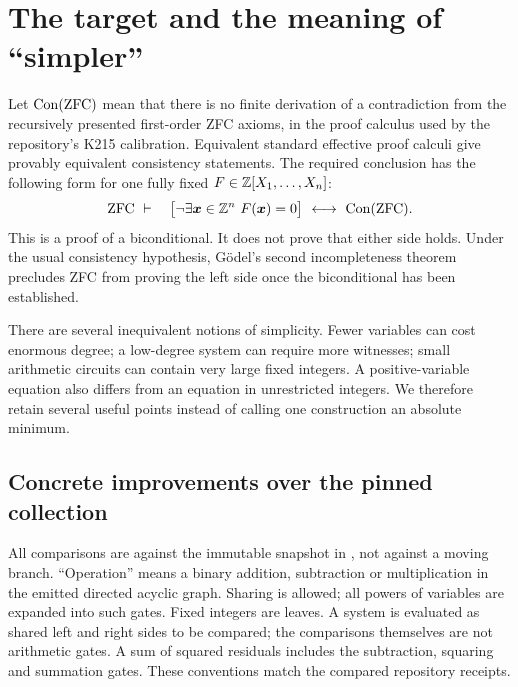 \section{The target and the meaning of ``simpler''}
\label{sec:overview}

Let $\operatorname{Con}(\mathrm{ZFC})$ mean that there is no finite derivation of a contradiction
from the recursively presented first-order ZFC axioms, in the proof
calculus used by the repository's K215 calibration.  Equivalent standard
effective proof calculi give provably equivalent consistency statements.
The required conclusion has the following form for one fully fixed
$F\in\mathbb Z[X_1,\ldots,X_n]$:
\begin{equation}\label{eq:target}
 \mathrm{ZFC}\ \vdash\quad
 \bigl[\neg\exists\boldsymbol{x}\in\mathbb Z^n\ F(\boldsymbol{x})=0\bigr]
 \ \longleftrightarrow\ \operatorname{Con}(\mathrm{ZFC}).
\end{equation}
This is a proof of a biconditional.  It does not prove that either side
holds.  Under the usual consistency hypothesis, G\"odel's second
incompleteness theorem precludes ZFC from proving the left side once
the biconditional has been established.

There are several inequivalent notions of simplicity.  Fewer variables
can cost enormous degree; a low-degree system can require more witnesses;
small arithmetic circuits can contain very large fixed integers.  A
positive-variable equation also differs from an equation in unrestricted
integers.  We therefore retain several useful points instead of calling
one construction an absolute minimum.

\subsection{Concrete improvements over the pinned collection}

All comparisons are against the immutable snapshot in \cite{repo}, not
against a moving branch.  ``Operation'' means a binary addition,
subtraction or multiplication in the emitted directed acyclic graph.
Sharing is allowed; all powers of variables are expanded into such
gates.  Fixed integers are leaves.  A system is evaluated as shared left
and right sides to be compared; the comparisons themselves are not
arithmetic gates.  A sum of squared residuals includes the subtraction,
squaring and summation gates.  These conventions match the compared
repository receipts.

